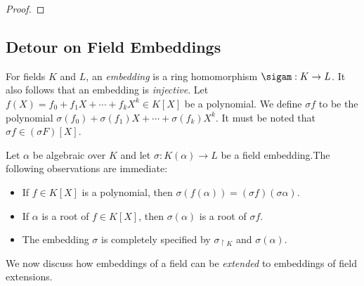 \documentclass[11pt]{article}
\begin{document}
\begin{proof}
\end{proof}

\subsection{Detour on Field Embeddings}\label{subsec:embeddings}
For fields $K$ and $L$, an {\em embedding} is a ring homomorphism $\sigam: K\rightarrow L$. It also follows that an
embedding is {\em injective}. Let $f(X)=f_0+f_1 X+\cdots+f_k X^k\in K[X]$ be a polynomial. We define $\sigma f$ to be the polynomial
$\sigma(f_0) + \sigma(f_1)X+\cdots + \sigma(f_k)X^k$. It must be noted that $\sigma f\in (\sigma F)[X]$.

Let $\alpha$ be algebraic over $K$ and let $\sigma: K(\alpha)\rightarrow L$ be a field embedding.The
following observations are immediate:
\begin{itemize}[leftmargin=2em]
\item If $f\in K[X]$ is a polynomial, then $\sigma(f(\alpha))=(\sigma f)(\sigma \alpha)$.
\item If $\alpha$ is a root of $f\in K[X]$, then $\sigma(\alpha)$ is a root of $\sigma f$.
\item The embedding $\sigma$ is completely specified by $\sigma_{\restriction K}$ and $\sigma(\alpha)$.
\end{itemize}

We now discuss how embeddings of a field can be {\em extended} to embeddings of field extensions.
\end{document}
